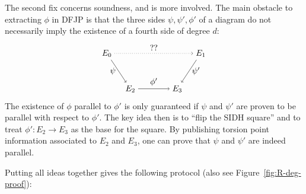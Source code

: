 The second fix concerns soundness, and is more involved.
The main obstacle to extracting $\phi$ in DFJP is that the three sides $\psi,\psi',\phi'$ of a diagram do not necessarily imply the existence of a fourth side of degree $d$:
%
\begin{equation*}
    \tikz[x=2cm,y=-1.5cm]{
    \node (E0) at (-0.5,0) {$E_0$};
    \node (E1) at (1.5,0) {$E_1$};
    \node (E2) at (0,1) {$E_2$};
    \node (E3) at (1,1) {$E_3$};
    \draw[->] (E0) edge[dotted] node[above] {??} (E1)
    (E0) edge node[left] {$\psi$} (E2)
    (E1) edge node[right] {$\psi'$} (E3)
    (E2) edge node[above] {$\phi'$} (E3);
    }
\end{equation*}
%
The existence of $\phi$ parallel to $\phi'$ is only guaranteed if $\psi$ and $\psi'$ are proven to be parallel with respect to $\phi'$.
The key idea then is to ``flip the SIDH square'' and to treat $\phi':E_2\to E_3$ as the base for the square.
By publishing torsion point information associated to $E_2$ and $E_3$, one can prove that $\psi$ and $\psi'$ are indeed parallel.

Putting all ideas together gives the following protocol (also see Figure~\ref{fig:R-deg-proof}):


